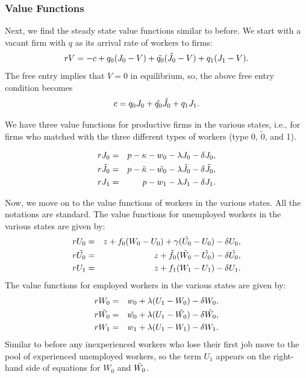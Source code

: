 \documentclass[12pt]{article} %
\theoremstyle{definition}
\begin{document}
\subsubsection{Value Functions}\label{section value functions no scar}
Next, we find the steady state value functions similar to before. We start with a vacant firm with $q$ as its arrival rate of workers to firms:
\begin{equation*}
   rV = -c + q_0 (J_0-V) + \Tilde{q_0}(\Tilde{J_0}-V) + q_1 (J_1-V).
\end{equation*}The free entry implies that $V=0$ in equilibrium, so, the above free entry condition becomes 
\begin{equation}
   c = q_0J_0 + \Tilde{q_0}\Tilde{J_0} + q_1J_1.\label{eq free entry no scar} 
\end{equation}

We have three value functions for productive firms in the various states, i.e., for firms who matched with the three different types of workers (type 0, $\tilde{0}$, and 1). 

\begin{eqnarray}
     rJ_0 &=& p-\kappa-w_0-\lambda J_0 - \delta J_0, \label{eq J0 no scar} \\
     r\Tilde{J_0} &=& p-\Tilde{\kappa}-\Tilde{w_0}-\lambda \Tilde{J_0} - \delta \Tilde{J_0}, \label{eq J0 tilde no scar} \\
    rJ_1 &=& p-w_1-\lambda J_1 - \delta J_1. \label{eq J1 no scar} 
    \end{eqnarray}

Now, we move on to the value functions of workers in the various states. All the notations are standard. The value functions for unemployed workers in the various states are given by: 
\begin{eqnarray}
    rU_0 &=& z+f_0(W_0-U_0)+\gamma(\Tilde{U_0}-U_0) - \delta U_0, \label{eq U0 no scar} \\
     r\Tilde{U_0} &=& z+\Tilde{f_0}(\Tilde{W_0}-\Tilde{U_0})- \delta \Tilde{U_0},
     \label{eq U0 tilde no scar} \\
    rU_1 &=& z+f_1(W_1-U_1)- \delta U_1. \label{eq U1 no scar} 
\end{eqnarray}
The value functions for employed workers in the various states are given by: 
\begin{eqnarray}
    rW_0 &=&w_0+\lambda(U_1-W_0)- \delta W_0, \label{eq W0 no scar} \\
     r\Tilde{W_0} &=& \Tilde{w_0}+\lambda(U_1-\Tilde{W_0})- \delta \Tilde{W_0},  \label{eq W0 tilde no scar} \\
     rW_1 &=& w_1+\lambda(U_1-W_1)- \delta W_1. \label{eq W1 no scar} 
     \end{eqnarray}
Similar to before any inexperienced workers who lose their first job move to the pool of experienced unemployed workers, so the term $U_1$ appears on the right-hand side of equations for $W_0$ and $\Tilde{W_0}$.
\end{document}
